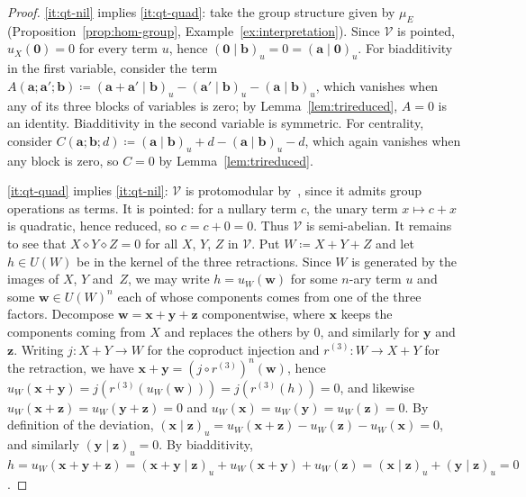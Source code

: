 \documentclass[reqno,a4paper]{amsart}
\theoremstyle{plain}
\theoremstyle{definition}
\newcommand{\DefEq}{\coloneq}
\newcommand{\V}{\ensuremath{\mathcal{V}}}
\newcommand{\U}{\ensuremath{U}}
\newcommand{\cosmash}{\ensuremath{\diamond}}
\begin{document}
\begin{proof}
  \ref{it:qt-nil} implies \ref{it:qt-quad}: take the group structure given by \(\mu_{E}\) (Proposition~\ref{prop:hom-group}, Example~\ref{ex:interpretation}). Since \(\V\) is pointed, \(u_{X}(\mathbf{0})=0\) for every term \(u\), hence \((\mathbf{0}\mid\mathbf{b})_{u}=0=(\mathbf{a}\mid\mathbf{0})_{u}\). For biadditivity in the first variable, consider the term \(A(\mathbf{a};\mathbf{a}';\mathbf{b})\DefEq(\mathbf{a}+\mathbf{a}'\mid\mathbf{b})_{u}-(\mathbf{a}'\mid\mathbf{b})_{u}-(\mathbf{a}\mid\mathbf{b})_{u}\), which vanishes when any of its three blocks of variables is zero; by Lemma~\ref{lem:trireduced}, \(A=0\) is an identity. Biadditivity in the second variable is symmetric. For centrality, consider \(C(\mathbf{a};\mathbf{b};d)\DefEq(\mathbf{a}\mid\mathbf{b})_{u}+d-(\mathbf{a}\mid\mathbf{b})_{u}-d\), which again vanishes when any block is zero, so \(C=0\) by Lemma~\ref{lem:trireduced}.

  \ref{it:qt-quad} implies \ref{it:qt-nil}: \(\V\) is protomodular by~\cite{BoJa}, since it admits group operations as terms. It is pointed: for a nullary term \(c\), the unary term \(x\mapsto c+x\) is quadratic, hence reduced, so \(c=c+0=0\). Thus \(\V\) is semi-abelian. It remains to see that \(X\cosmash Y\cosmash Z=0\) for all \(X\), \(Y\), \(Z\) in \(\V\). Put \(W\DefEq X+Y+Z\) and let \(h\in\U(W)\) be in the kernel of the three retractions. Since \(W\) is generated by the images of \(X\), \(Y\) and~\(Z\), we may write \(h=u_{W}(\mathbf{w})\) for some \(n\)-ary term \(u\) and some \(\mathbf{w}\in\U(W)^{n}\) each of whose components comes from one of the three factors. Decompose \(\mathbf{w}=\mathbf{x}+\mathbf{y}+\mathbf{z}\) componentwise, where \(\mathbf{x}\) keeps the components coming from \(X\) and replaces the others by \(0\), and similarly for \(\mathbf{y}\) and \(\mathbf{z}\). Writing \(j\colon X+Y\to W\) for the coproduct injection and \(r^{(3)}\colon W\to X+Y\) for the retraction, we have \(\mathbf{x}+\mathbf{y}=(j\circ r^{(3)})^{n}(\mathbf{w})\), hence \(u_{W}(\mathbf{x}+\mathbf{y})=j(r^{(3)}(u_{W}(\mathbf{w})))=j(r^{(3)}(h))=0\), and likewise \(u_{W}(\mathbf{x}+\mathbf{z})=u_{W}(\mathbf{y}+\mathbf{z})=0\) and \(u_{W}(\mathbf{x})=u_{W}(\mathbf{y})=u_{W}(\mathbf{z})=0\). By definition of the deviation, \((\mathbf{x}\mid\mathbf{z})_{u}=u_{W}(\mathbf{x}+\mathbf{z})-u_{W}(\mathbf{z})-u_{W}(\mathbf{x})=0\), and similarly \((\mathbf{y}\mid\mathbf{z})_{u}=0\). By biadditivity, \(h=u_{W}(\mathbf{x}+\mathbf{y}+\mathbf{z})=(\mathbf{x}+\mathbf{y}\mid\mathbf{z})_{u}+u_{W}(\mathbf{x}+\mathbf{y})+u_{W}(\mathbf{z})=(\mathbf{x}\mid\mathbf{z})_{u}+(\mathbf{y}\mid\mathbf{z})_{u}=0\).
\end{proof}
\end{document}
